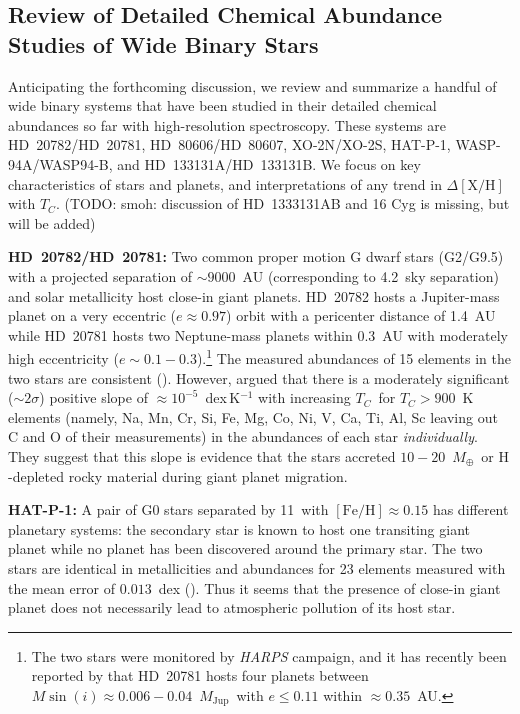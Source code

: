 \documentclass[modern, letterpaper]{aastex61}
\newcommand{\project}[1]{\textsl{#1}}
\newcommand*\elem[1]{\ensuremath{\mathrm{#1}}}
\newcommand*\elemH[1]{\ensuremath{[\mathrm{#1}/\elem{H}]}}
\newcommand*{\feh}{\ensuremath{\elemH{Fe}}}
\newcommand{\Tcondens}{\ensuremath{T_C}}
\newcommand{\mearth}{\ensuremath{M_\oplus}}
\newcommand{\mjupiter}{\ensuremath{M_\mathrm{Jup}}}
\newcommand{\todo}[1]{{\color{blue}TODO: #1}}
\begin{document}
\subsection{Review of Detailed Chemical Abundance Studies of Wide Binary Stars}
\label{sub:review}

Anticipating the forthcoming discussion, we review and summarize a handful of
wide binary systems that have been studied in
their detailed chemical abundances so far with high-resolution spectroscopy.
These systems are HD~20782/HD~20781, HD~80606/HD~80607, XO-2N/XO-2S, HAT-P-1,
WASP-94A/WASP94-B, and HD~133131A/HD~133131B.
We focus on key characteristics of stars and planets, and interpretations of
any trend in $\Delta\elemH{X}$ with \Tcondens.
(\todo{smoh: discussion of HD~1333131AB and 16 Cyg is missing, but will be added})

{\bf HD~20782/HD~20781:}
Two common proper motion G dwarf stars (G2/G9.5) with a projected separation of
$\sim9000$~AU (corresponding to 4.2\arcmin\ sky separation) and solar metallicity
host close-in giant planets.
HD~20782 hosts a Jupiter-mass planet on a very eccentric ($e\approx 0.97$)
orbit with a pericenter distance of 1.4~AU while HD~20781 hosts two
Neptune-mass planets within 0.3~AU with moderately high eccentricity
($e\sim0.1-0.3$).\footnote{
  The two stars were monitored by \project{HARPS} campaign, and it has recently
  been reported by \citealt{2017arXiv170505153U} that HD~20781 hosts four
  planets between $M\sin(i)\approx 0.006-0.04$~\mjupiter\ with $e \le 0.11$
  within $\approx 0.35$~AU.}
The measured abundances of 15 elements in the two stars are consistent
(\citealt{Mack:2014aa}).
However, \citealt{Mack:2014aa} argued that there is a moderately significant
($\sim 2\sigma$) positive slope of $\approx 10^{-5}$~dex\,K$^{-1}$ with
increasing \Tcondens\ for $\Tcondens>900$~K elements (namely, Na, Mn, Cr, Si,
Fe, Mg, Co, Ni, V, Ca, Ti, Al, Sc leaving out C and O of their measurements) in
the abundances of each star {\it individually}.
They suggest that this slope is evidence that the stars accreted
$10-20$~\mearth\ or \elem{H}-depleted rocky material during giant planet
migration.

{\bf HAT-P-1:}
A pair of G0 stars separated by 11\arcsec\ with $\feh\approx0.15$ has
different planetary systems:
the secondary star is known to host one transiting giant planet
while no planet has been discovered around the primary star.
The two stars are identical
in metallicities and abundances for 23 elements measured with
the mean error of $0.013$~dex (\citealt{Liu:2014aa}).
Thus it seems that the presence of close-in giant planet does not necessarily
lead to atmospheric pollution of its host star.
\end{document}
